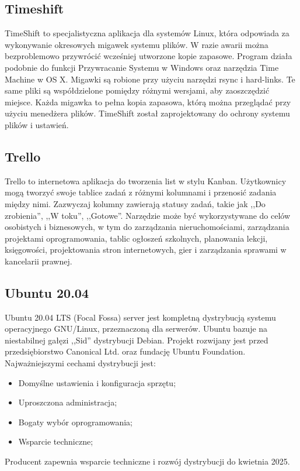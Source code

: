 \documentclass[12pt,a4paper]{article}
\begin{document}
		\subsection{Timeshift}
			\indent TimeShift to specjalistyczna aplikacja dla systemów Linux, która odpowiada za wykonywanie okresowych migawek systemu plików.
			W razie awarii można bezproblemowo przywrócić wcześniej utworzone kopie zapasowe. Program działa podobnie do funkcji Przywracanie Systemu w Windows oraz narzędzia
			Time Machine w OS X. Migawki są robione przy użyciu narzędzi rsync i hard-links. Te same pliki są współdzielone pomiędzy różnymi wersjami, aby zaoszczędzić miejsce.
			Każda migawka to pełna kopia zapasowa, którą można przeglądać przy użyciu menedżera plików. TimeShift został zaprojektowany do ochrony systemu plików i ustawień.
			
		\subsection{Trello}
			\indent Trello to internetowa aplikacja do tworzenia list w stylu Kanban. Użytkownicy mogą tworzyć swoje tablice zadań z różnymi kolumnami i przenosić zadania
		między nimi. Zazwyczaj kolumny zawierają statusy zadań, takie jak ,,Do zrobienia'', ,,W toku'', ,,Gotowe''. Narzędzie może być wykorzystywane do celów osobistych i biznesowych,
		w tym do zarządzania nieruchomościami, zarządzania projektami oprogramowania, tablic ogłoszeń szkolnych, planowania lekcji, księgowości, projektowania stron internetowych,
		gier i zarządzania sprawami w kancelarii prawnej.
		
		\subsection{Ubuntu 20.04}		
		\indent Ubuntu 20.04 LTS (Focal Fossa) server jest kompletną dystrybucją systemu operacyjnego GNU/Linux, przeznaczoną dla serwerów. Ubuntu bazuje na niestabilnej gałęzi ,,Sid''
			dystrybucji Debian. Projekt rozwijany jest przed przedsiębiorstwo Canonical Ltd. oraz fundację Ubuntu Foundation. Najważniejszymi cechami dystrybucji jest:
			\begin{itemize}
				\item Domyślne ustawienia i konfiguracja sprzętu;
				\item Uproszczona administracja;
				\item Bogaty wybór oprogramowania;
				\item Wsparcie techniczne;
			\end{itemize}
			Producent zapewnia wsparcie techniczne i rozwój dystrybucji do kwietnia 2025.
			
\end{document}
